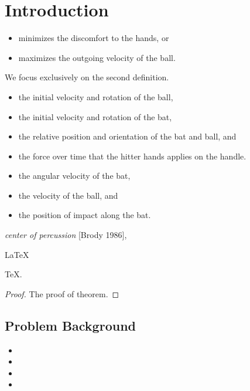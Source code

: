 \documentclass{mcmthesis}
\begin{document}
\section{Introduction}
\lipsum[2]
\begin{itemize}
\item minimizes the discomfort to the hands, or 
\item maximizes the outgoing velocity of the ball.
\end{itemize}
We focus exclusively on the second definition.
\begin{itemize}
\item the initial velocity and rotation of the ball,
\item the initial velocity and rotation of the bat,
\item the relative position and orientation of the bat and ball, and
\item the force over time that the hitter hands applies on the handle.
\end{itemize}
\lipsum[3]
\begin{itemize}
\item the angular velocity of the bat,
\item the velocity of the ball, and
\item the position of impact along the bat.
\end{itemize}
\lipsum[4]
\emph{center of percussion} [Brody 1986], \lipsum[5]
\begin{Theorem} \label{thm:latex}
\LaTeX
\end{Theorem}
\begin{Lemma} \label{thm:tex}
\TeX .
\end{Lemma}
\begin{proof}
The proof of theorem.
\end{proof}

\subsection{Problem Background}
\lipsum[6]
\begin{itemize}
\item
\item
\item
\item
\end{itemize}
\end{document}
